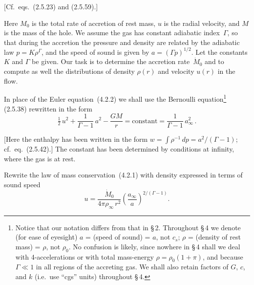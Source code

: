 

[Cf.\ eqs.\ (2.5.23) and (2.5.59).]

Here $M_0$ is the total rate of accretion of rest mass, $u$ is the radial
velocity, and $M$ is the mass of the hole.  We assume the gas has constant
adiabatic index~$\Gamma$, so that during the accretion the pressure and
density are related by the adiabatic law $p = K\rho^\Gamma$, and the speed of
sound is given by $a = (\Gamma p)^{1/2}$.  Let the constants $K$ and $\Gamma$
be given.  Our task is to determine the accretion rate~$\dot{M}_0$ and to
compute as well the distributions of density $\rho(r)$ and velocity $u(r)$
in the flow.

In place of the Euler equation~(4.2.2) we shall use the Bernoulli
equation\footnote{Notice that our notation differs from that in \S\,2.
Throughout \S\,4 we denote (for ease of eyesight)
$a$ = (speed of sound) = $a$, not $c_s$;
$\rho$ = (density of rest mass) = $\rho$, not $\rho_0$.
No confusion is likely, since nowhere in \S\,4 shall we deal with
4-accelerations or with total mass-energy $\rho = \rho_0(1+\pi)$, and
because $\Gamma \ll 1$ in all regions of the accreting gas.
We shall also retain factors of $G$, $c$, and $k$ (i.e.\ use ``cgs'' units)
throughout \S\,4.}
(2.5.38) rewritten in the form
\begin{equation}
\tfrac{1}{2}\,u^2 + \frac{1}{\Gamma - 1}\,a^2 - \frac{GM}{r}
= \text{constant}
= \frac{1}{\Gamma - 1}\,a_\infty^2\,.
\tag{4.2.3}
\end{equation}

[Here the enthalpy has been written in the form
$w = \int \rho^{-1}\,dp = a^2/(\Gamma-1)$;
cf.\ eq.\ (2.5.42).]  The constant has been determined by conditions at
infinity, where the gas is at rest.

Rewrite the law of mass conservation~(4.2.1) with density expressed in terms
of sound speed
\begin{equation}
u = \frac{\dot{M}_0}{4\pi\rho_\infty\,r^2}
    \left(\frac{a_\infty}{a}\right)^{2/(\Gamma-1)}\!.
\tag{4.2.4}
\end{equation}

